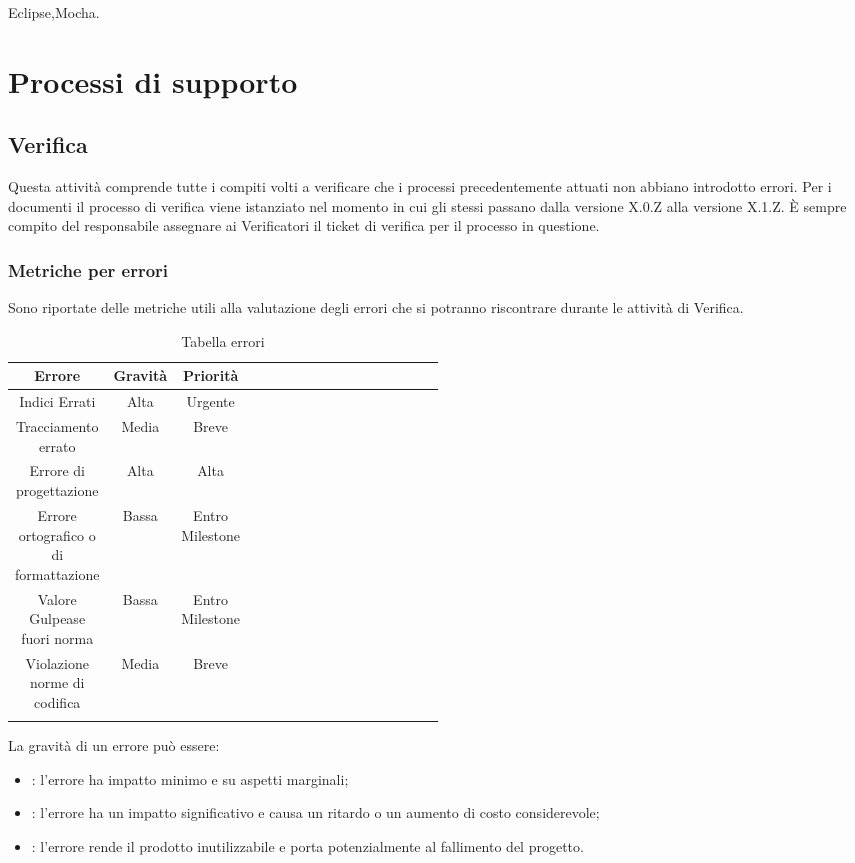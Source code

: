 Eclipse,Mocha.


\section{Processi di supporto}

\subsection{Verifica}
Questa attivit\`{a} comprende tutte i compiti volti a verificare che i processi precedentemente attuati non abbiano introdotto errori.
Per i documenti il processo di verifica viene istanziato nel momento in cui gli stessi passano dalla versione X.0.Z alla versione X.1.Z. 
È sempre compito del responsabile assegnare ai Verificatori il ticket di verifica per il processo in questione.

\subsubsection{Metriche per errori}
Sono riportate delle metriche utili alla valutazione degli errori che si potranno riscontrare durante le attivit\`{a} di Verifica.
\begin{center}
\begin{longtable}{|c|c|c|p{0.5\linewidth}|}
\toprule
\textbf{Errore} & \textbf{Gravità} & \textbf{Priorità} \\

\midrule
Indici Errati & Alta & Urgente\\
\midrule
Tracciamento errato & Media & Breve\\
\midrule
Errore di progettazione & Alta & Alta\\
\midrule
Errore ortografico o di formattazione & Bassa & Entro Milestone\\
\midrule
Valore Gulpease fuori norma & Bassa & Entro Milestone\\
\midrule
Violazione norme di codifica & Media & Breve\\

\bottomrule
\caption{Tabella errori}
\label{tab:changelog}
\end{longtable}
\end{center}

La gravità di un errore può essere:

\begin{itemize}
\item {}: l'errore ha impatto minimo e su aspetti marginali;
\item {}: l'errore ha un impatto significativo e causa un ritardo o un aumento di costo considerevole;
\item {}: l'errore rende il prodotto inutilizzabile e porta potenzialmente al fallimento del progetto.
\end{itemize}

